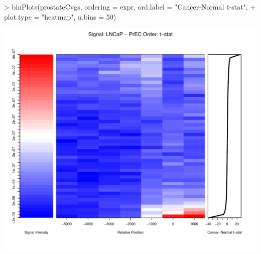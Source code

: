 \begin{Schunk}
\begin{Sinput}
> binPlots(prostateCvgs, ordering = expr, ord.label = "Cancer-Normal t-stat", 
+     plot.type = "heatmap", n.bins = 50)
\end{Sinput}
\end{Schunk}
\includegraphics{binPlotsHeatmap-binPlotsHeatmap}
